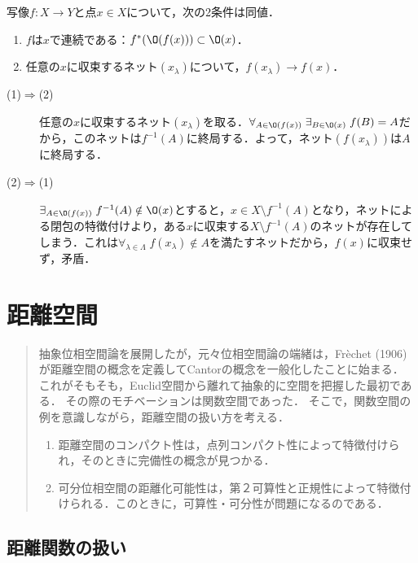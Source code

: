 \documentclass[uplatex,dvipdfmx]{jsreport}
\begin{document}
\begin{proposition}
    写像$f:X\to Y$と点$x\in X$について，次の2条件は同値．
    \begin{enumerate}
        \item $f$は$x$で連続である：$f^*(\O(f(x)))\subset\O(x)$．
        \item 任意の$x$に収束するネット$(x_\lambda)$について，$f(x_\lambda)\to f(x)$．
    \end{enumerate}
\end{proposition}
\begin{Proof}\mbox{}
    \begin{description}
        \item[(1)$\Rightarrow$(2)] 任意の$x$に収束するネット$(x_\lambda)$を取る．$\forall_{A\in\O(f(x))}\;\exists_{B\in\O(x)}\;f(B)=A$だから，このネットは$f^{-1}(A)$に終局する．よって，ネット$(f(x_\lambda))$は$A$に終局する．
        \item[(2)$\Rightarrow$(1)] $\exists_{A\in\O(f(x))}\;f^{-1}(A)\notin\O(x)$とすると，$x\in X\setminus f^{-1}(A)$となり，ネットによる閉包の特徴付けより，ある$x$に収束する$X\setminus f^{-1}(A)$のネットが存在してしまう．これは$\forall_{\lambda\in\Lambda}\;f(x_\lambda)\notin A$を満たすネットだから，$f(x)$に収束せず，矛盾．
    \end{description}
\end{Proof}

\chapter{距離空間}

\begin{quotation}
    抽象位相空間論を展開したが，元々位相空間論の端緒は，Fr\`{e}chet (1906)が距離空間の概念を定義してCantorの概念を一般化したことに始まる．
    これがそもそも，Euclid空間から離れて抽象的に空間を把握した最初である．
    その際のモチベーションは関数空間であった．
    そこで，関数空間の例を意識しながら，距離空間の扱い方を考える．
    \begin{enumerate}
        \item 距離空間のコンパクト性は，点列コンパクト性によって特徴付けられ，そのときに完備性の概念が見つかる．
        \item 可分位相空間の距離化可能性は，第２可算性と正規性によって特徴付けられる．このときに，可算性・可分性が問題になるのである．
    \end{enumerate}
\end{quotation}

\section{距離関数の扱い}
\end{document}
